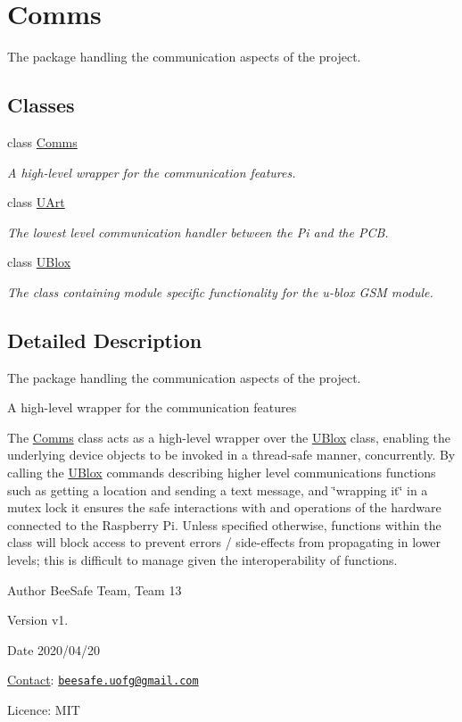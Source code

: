 \hypertarget{group___comms}{}\section{Comms}
\label{group___comms}


The package handling the communication aspects of the project.  


\subsection*{Classes}
\begin{DoxyCompactItemize}
\item 
class \hyperlink{class_comms}{Comms}
\begin{DoxyCompactList}\small\item\em A high-\/level wrapper for the communication features. \end{DoxyCompactList}\item 
class \hyperlink{class_u_art}{U\+Art}
\begin{DoxyCompactList}\small\item\em The lowest level communication handler between the Pi and the P\+CB. \end{DoxyCompactList}\item 
class \hyperlink{class_u_blox}{U\+Blox}
\begin{DoxyCompactList}\small\item\em The class containing module specific functionality for the u-\/blox G\+SM module. \end{DoxyCompactList}\end{DoxyCompactItemize}


\subsection{Detailed Description}
The package handling the communication aspects of the project. 

A high-\/level wrapper for the communication features

The \hyperlink{class_comms}{Comms} class acts as a high-\/level wrapper over the \hyperlink{class_u_blox}{U\+Blox} class, enabling the underlying device objects to be invoked in a thread-\/safe manner, concurrently. By calling the \hyperlink{class_u_blox}{U\+Blox} commands describing higher level communications functions such as getting a location and sending a text message, and \char`\"{}wrapping it\char`\"{} in a mutex lock it ensures the safe interactions with and operations of the hardware connected to the Raspberry Pi. Unless specified otherwise, functions within the class will block access to prevent errors / side-\/effects from propagating in lower levels; this is difficult to manage given the interoperability of functions.

\begin{DoxyAuthor}{Author}
Bee\+Safe Team, Team 13
\end{DoxyAuthor}
\begin{DoxyVersion}{Version}
v1.
\end{DoxyVersion}
\begin{DoxyDate}{Date}
2020/04/20
\end{DoxyDate}
\hyperlink{class_contact}{Contact}\+: \href{mailto:beesafe.uofg@gmail.com}{\tt beesafe.\+uofg@gmail.\+com}

Licence\+: M\+IT 